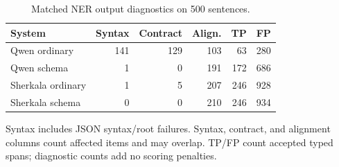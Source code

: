 \begin{table}[t]
\centering
\caption{Matched NER output diagnostics on 500 sentences.}
\label{tab:schema-diagnostics}
\begingroup\fontsize{8}{9.3}\selectfont
\setlength{\tabcolsep}{3.2pt}\renewcommand{\arraystretch}{1.08}
\begin{tabular}{@{}lrrrrr@{}}
\toprule
System & Syntax & Contract & Align. & TP & FP\\
\midrule
Qwen ordinary & 141 & 129 & 103 & 63 & 280\\
Qwen schema & 1 & 0 & 191 & 172 & 686\\
Sherkala ordinary & 1 & 5 & 207 & 246 & 928\\
Sherkala schema & 0 & 0 & 210 & 246 & 934\\
\bottomrule
\end{tabular}
\par\smallskip
\begin{minipage}{\columnwidth}\raggedright\fontsize{8}{9.3}\selectfont
Syntax includes JSON syntax/root failures. Syntax, contract, and alignment columns count affected items and may overlap. TP/FP count accepted typed spans; diagnostic counts add no scoring penalties.
\end{minipage}\endgroup
\end{table}
